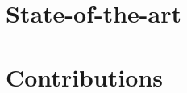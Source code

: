 \documentclass[12pt,a4paper]{memoir}
\begin{document}
	
	
\dominitoc 
\frontmatter






\newpage
\setcounter{tocdepth}{2}
\tableofcontents


\mainmatter




\part{State-of-the-art}

\setcounter{mtc}{2} 

\setcounter{mtc}{3} 


\part{Contributions}
\setcounter{mtc}{4} 

\setcounter{mtc}{5} 




\balance


\end{document}
